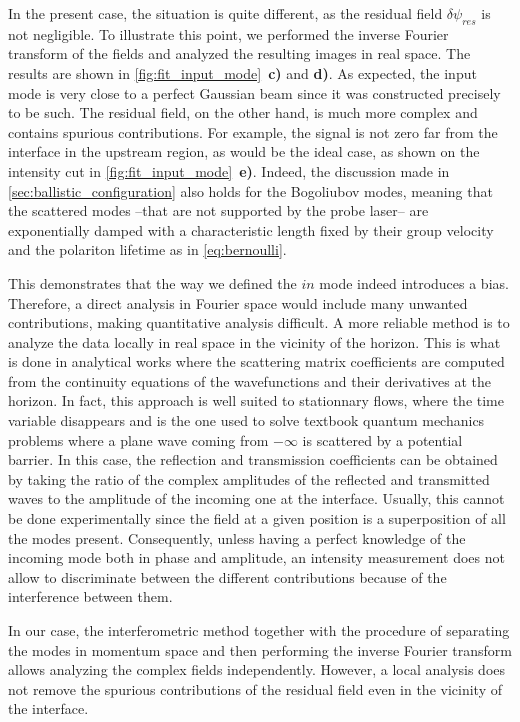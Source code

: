 In the present case, the situation is quite different, as the residual field $\delta \psi_{res}$ is not negligible. To illustrate this point, we performed the inverse Fourier transform of the fields and analyzed the resulting images in real space.
The results are shown in \autoref{fig:fit_input_mode}~\textbf{c)} and \textbf{d)}. As expected, the input mode is very close to a perfect Gaussian beam since it was constructed precisely to be such.
The residual field, on the other hand, is much more complex and contains spurious contributions. For example, the signal is not zero far from the interface in the upstream region, as would be the ideal case, as shown on the intensity cut in \autoref{fig:fit_input_mode}~\textbf{e)}.
Indeed, the discussion made in \autoref{sec:ballistic_configuration} also holds for the Bogoliubov modes, meaning that the scattered modes --that are not supported by the probe laser--
are exponentially damped with a characteristic length fixed by their group velocity and the polariton lifetime as in \autoref{eq:bernoulli}.


This demonstrates that the way we defined the $in$ mode indeed introduces a bias. Therefore, a direct analysis in Fourier space would include many unwanted contributions, making quantitative analysis difficult. 
A more reliable method is to analyze the data locally in real space in the vicinity of the horizon. This is what is done in analytical works \cite{Recati_acousticHR_2009,carusotto_fluidlightproposal_2012} where the scattering matrix coefficients are computed from the continuity equations of the wavefunctions and their derivatives at the horizon. In fact, this approach is well suited to stationnary flows, where the time variable disappears and is the one used to solve textbook quantum mechanics problems \cite{CCT_tome1} where a plane wave coming from $-\infty$ is scattered by a potential barrier. In this case, the reflection and transmission coefficients can be obtained by taking the ratio of the complex amplitudes of the reflected and transmitted waves to the amplitude of the incoming one at the interface. Usually, this cannot be done experimentally since the field at a given position is a superposition of all the modes present. Consequently, unless having a perfect knowledge of the incoming mode both in phase and amplitude, an intensity measurement does not allow to discriminate between the different contributions because of the interference between them.


In our case, the interferometric method together with the procedure of separating the modes in momentum space and then performing the inverse Fourier transform allows analyzing the complex fields independently. However, a local analysis does not remove the spurious contributions of the residual field even in the vicinity of the interface.



